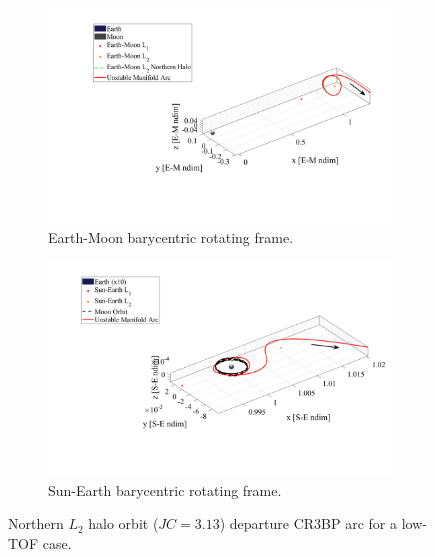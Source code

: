 \begin{figure}[H]
    \begin{subfigure}[h]{0.495\linewidth}
        \includegraphics[width=\textwidth]{figures/DirectMinTOFEM.pdf}
        \caption{Earth-Moon barycentric rotating frame.}
    \end{subfigure}
    \hfill
    \begin{subfigure}[h]{0.495\linewidth}
        \includegraphics[width=\textwidth]{figures/DirectMinTOFSE.pdf}
        \caption{Sun-Earth barycentric rotating frame.}
    \end{subfigure}
    \caption{Northern $L_{2}$ halo orbit ($JC=3.13$) departure CR3BP arc for a low-TOF case.}
    \label{fig:directMinTOFE}
\end{figure}

